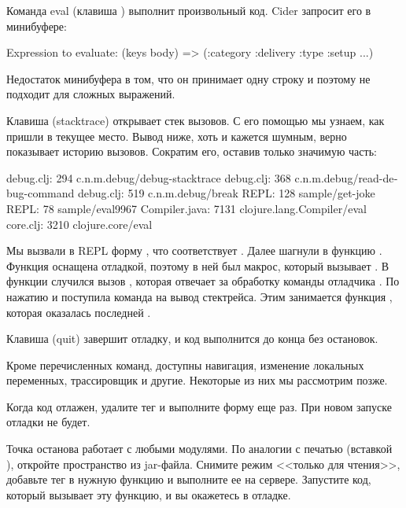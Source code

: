 Команда eval (клавиша ) выполнит произвольный код. Cider запросит его в минибуфере:

\begin{english}
  \begin{text}
Expression to evaluate: (keys body)
=> (:category :delivery :type :setup ...)
  \end{text}
\end{english}

Недостаток минибуфера в том, что он принимает одну строку и поэтому не подходит для сложных выражений.

Клавиша  (stacktrace) открывает стек вызовов. С его помощью мы узнаем, как пришли в текущее место. Вывод ниже, хоть и кажется шумным, верно показывает историю вызовов. Сократим его, оставив только значимую часть:

\begin{english}
  \begin{text/lines}
    debug.clj:  294  c.n.m.debug/debug-stacktrace
    debug.clj:  368  c.n.m.debug/read-debug-command
    debug.clj:  519  c.n.m.debug/break
         REPL:  128  sample/get-joke
         REPL:   78  sample/eval9967
Compiler.java: 7131  clojure.lang.Compiler/eval
     core.clj: 3210  clojure.core/eval
  \end{text/lines}
\end{english}

Мы вызвали в REPL форму , что соответствует  . Далее шагнули в функцию  . Функция оснащена отладкой, поэтому в ней был макрос, который вызывает . В функции  случился вызов , которая отвечает за обработку команды отладчика . По нажатию  и поступила команда на вывод стектрейса. Этим занимается функция , которая оказалась последней .

Клавиша  (quit) завершит отладку, и код выполнится до конца без остановок.

Кроме перечисленных команд, доступны навигация, изменение локальных переменных, трассировщик и другие. Некоторые из них мы рассмотрим позже.

Когда код отлажен, удалите тег  и выполните форму еще раз. При новом запуске отладки не будет.

Точка останова работает с любыми модулями. По аналогии с печатью (вставкой ), откройте пространство из jar-файла. Снимите режим <<только для чтения>>, добавьте тег  в нужную функцию и выполните ее на сервере. Запустите код, который вызывает эту функцию, и вы окажетесь в отладке.

